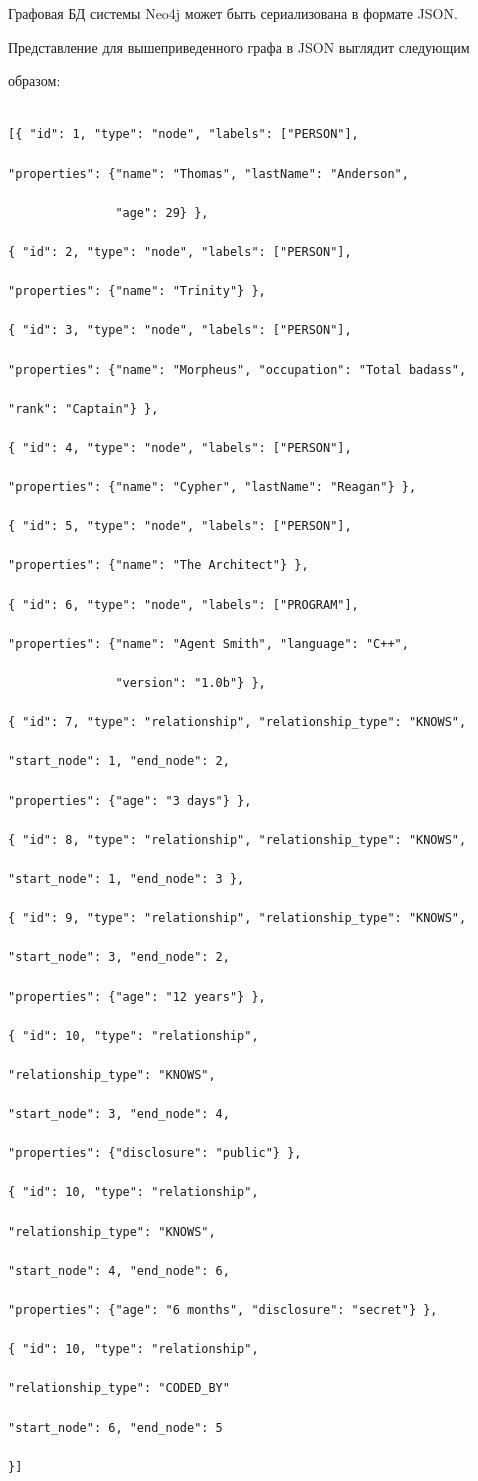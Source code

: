      Графовая БД системы Neo4j может быть сериализована в формате JSON.

Представление для вышеприведенного графа в JSON выглядит следующим

образом:

      \begin{verbatim}

[{ "id": 1, "type": "node", "labels": ["PERSON"],

"properties": {"name": "Thomas", "lastName": "Anderson",

               "age": 29} },

{ "id": 2, "type": "node", "labels": ["PERSON"],

"properties": {"name": "Trinity"} },

{ "id": 3, "type": "node", "labels": ["PERSON"],

"properties": {"name": "Morpheus", "occupation": "Total badass",

"rank": "Captain"} },

{ "id": 4, "type": "node", "labels": ["PERSON"],

"properties": {"name": "Cypher", "lastName": "Reagan"} },

{ "id": 5, "type": "node", "labels": ["PERSON"],

"properties": {"name": "The Architect"} },

{ "id": 6, "type": "node", "labels": ["PROGRAM"],

"properties": {"name": "Agent Smith", "language": "C++",

               "version": "1.0b"} },

{ "id": 7, "type": "relationship", "relationship_type": "KNOWS",

"start_node": 1, "end_node": 2,

"properties": {"age": "3 days"} },

{ "id": 8, "type": "relationship", "relationship_type": "KNOWS",

"start_node": 1, "end_node": 3 },

{ "id": 9, "type": "relationship", "relationship_type": "KNOWS",

"start_node": 3, "end_node": 2,

"properties": {"age": "12 years"} },

{ "id": 10, "type": "relationship",

"relationship_type": "KNOWS",

"start_node": 3, "end_node": 4,

"properties": {"disclosure": "public"} },

{ "id": 10, "type": "relationship",

"relationship_type": "KNOWS",

"start_node": 4, "end_node": 6,

"properties": {"age": "6 months", "disclosure": "secret"} },

{ "id": 10, "type": "relationship",

"relationship_type": "CODED_BY"

"start_node": 6, "end_node": 5

}]

\end{verbatim}

